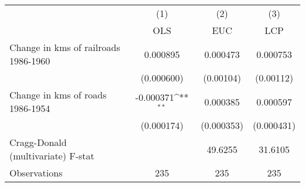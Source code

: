 {
\def\sym#1{\ifmmode^{#1}\else\(^{#1}\)\fi}
\begin{tabular}{l*{3}{c}}
\hline\hline
                &\multicolumn{1}{c}{(1)}&\multicolumn{1}{c}{(2)}&\multicolumn{1}{c}{(3)}\\
                &\multicolumn{1}{c}{OLS}&\multicolumn{1}{c}{EUC}&\multicolumn{1}{c}{LCP}\\
\hline
Change in kms of railroads 1986-1960& 0.000895         & 0.000473         & 0.000753         \\
                &(0.000600)         &(0.00104)         &(0.00112)         \\
[1em]
Change in kms of roads 1986-1954&-0.000371\sym{**} & 0.000385         & 0.000597         \\
                &(0.000174)         &(0.000353)         &(0.000431)         \\
\hline
Cragg-Donald (multivariate) F-stat&                  &  49.6255         &  31.6105         \\
Observations    &      235         &      235         &      235         \\
\hline\hline
\end{tabular}
}
